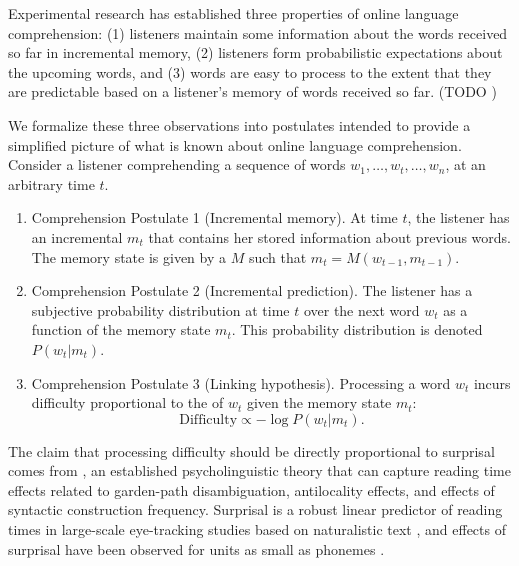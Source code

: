 Experimental research has established three properties of online language comprehension: (1) listeners maintain some information about the words received so far in incremental memory, (2) listeners form probabilistic expectations about the upcoming words, and (3) words are easy to process to the extent that they are predictable based on a listener's memory of words received so far. (TODO \REF)

We formalize these three observations into postulates intended to provide a simplified picture of what is known about online language comprehension. Consider a listener comprehending a sequence of words $w_1, \dots, w_t, \dots, w_n$, at an arbitrary time $t$.
\begin{enumerate}
    \item Comprehension Postulate 1 (Incremental memory). At time $t$, the listener has an incremental  $m_t$ that contains her stored information about previous words. The memory state is given by a  $M$ such that $m_t = M(w_{t-1}, m_{t-1})$.
    \item Comprehension Postulate 2 (Incremental prediction). The listener has a subjective probability distribution at time $t$ over the next word $w_t$ as a function of the memory state $m_t$. This probability distribution is denoted $P(w_t|m_t)$.
    \item Comprehension Postulate 3 (Linking hypothesis). Processing a word $w_t$ incurs difficulty proportional to the  of $w_t$ given the memory state $m_t$:
    \begin{equation}
    \label{eq:lossy-surp}
    \text{Difficulty} \propto -\log P(w_t | m_t).
\end{equation}
\end{enumerate}
The claim that processing difficulty should be directly proportional to surprisal comes from  \citep{hale2001probabilistic,levy2008expectation}, an established psycholinguistic theory that can capture reading time effects related to garden-path disambiguation, antilocality effects, and effects of syntactic construction frequency. Surprisal is a robust linear predictor of reading times in large-scale eye-tracking studies based on naturalistic text \citep{smith-effect-2013,goodkind-predictive-2018}, and effects of surprisal have been observed for units as small as phonemes \citep{}.


